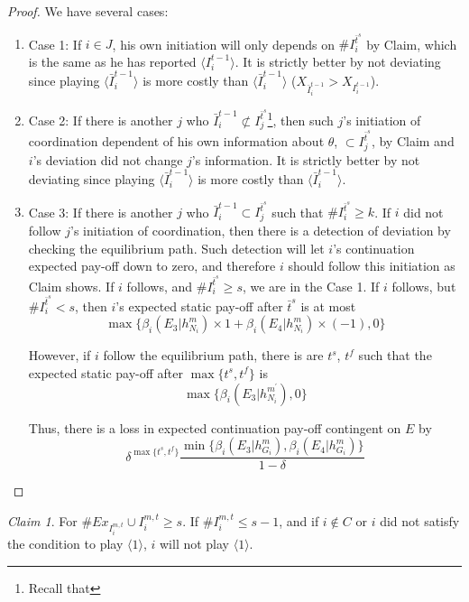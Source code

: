 \documentclass[12pt,letter]{article}
\theoremstyle{definition}
\theoremstyle{remark}
\theoremstyle{claim}
\newtheorem{claim}{Claim}
\begin{document}
\begin{proof}
We have several cases:
\begin{enumerate}
\item Case 1: If $i\in J$, his own initiation will only depends on $\# I^{\bar{t}^s}_i$ by Claim, which is the same as he has reported $\langle {I}^{t-1}_i\rangle$. It is strictly better by not deviating since playing $\langle\bar{I}^{t-1}_i\rangle$ is more costly than $\langle\bar{I}^{t-1}_i\rangle$ ($X_{\bar{I}^{t-1}_i}>X_{I^{t-1}_i}$).
\item Case 2: If there is another $j$ who $\bar{I}^{t-1}_i\not\subset I^{\bar{t}^{s}}_j$\footnote{Recall that }, then such $j$'s initiation of coordination dependent of his own information about $\theta$, $\subset I^{\bar{t}^{s}}_j$, by Claim and $i$'s deviation did not change $j$'s information. It is strictly better by not deviating since playing $\langle\bar{I}^{t-1}_i\rangle$ is more costly than $\langle\bar{I}^{t-1}_i\rangle$.
\item Case 3: If there is another $j$ who $\bar{I}^{t-1}_i\subset {I}^{\bar{t}^{s}}_j$ such that $\# I^{\bar{t}^s}_i\geq k$. If $i$ did not follow $j$'s initiation of coordination, then there is a detection of deviation by checking the equilibrium path. Such detection will let $i$'s continuation expected pay-off down to zero, and therefore $i$ should follow this initiation as Claim shows. If $i$ follows, and $\#I^{\bar{t}^s}_i\geq s$, we are in the Case 1. If $i$ follows, but $\#I^{\bar{t}^s}_i< s$, then $i$'s expected static pay-off after $\bar{t}^{s}$ is at most
\[
{\max\{\beta_{i}(E_3|h^{m}_{N_i})\times 1+\beta_{i}(E_4|h^{m}_{N_i})\times (-1), 0\}}
\]

However, if $i$ follow the equilibrium path, there is are $t^s$, $t^f$ such that the expected static pay-off after $\max\{t^s,t^f\}$ is
\[\max\{\beta_{i}(E_3|h^{m^{'}}_{N_i}),0\}\]

Thus, there is a loss in expected continuation pay-off contingent on $E$ by
\[\delta^{\max\{t^s,t^f\}}\frac{\min\{\beta_{i}(E_3|h^{m}_{G_i}),\beta_{i}(E_4|h^{m}_{G_i})\}}{1-\delta}\]
\end{enumerate}


\end{proof}



\begin{claim} 
\label{claim_can_not_pretend_almost_success}
For $\#Ex_{I^{m,t}_i}\cup I^{m,t}_i\geq s$. If $\#I^{m,t}_i\leq s-1$, and if $i\notin C$ or $i$ did not satisfy the condition to play $\langle 1 \rangle$, $i$ will not play $\langle 1 \rangle$.
\end{claim}
\end{document}
